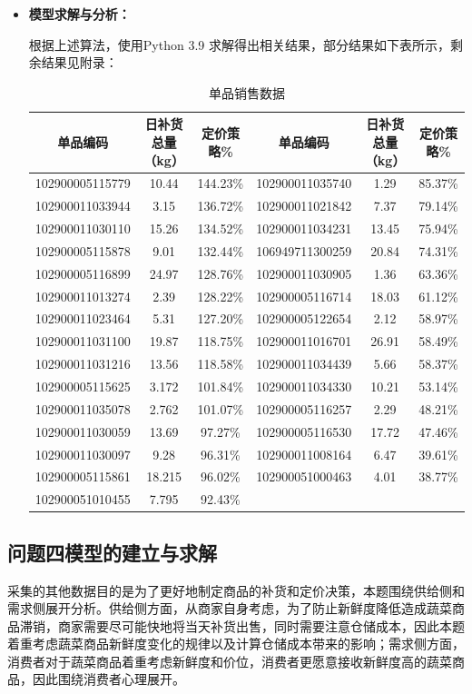 \documentclass{my_paper}
\begin{document}
\begin{itemize}
    \item \textbf{模型求解与分析：}\par
    \hspace{2em}根据上述算法，使用Python 3.9 求解得出相关结果，部分结果如下表所示，剩余结果见附录：
    \begin{table}[H]
    \caption{单品销售数据}
    \centering
    \begin{tabular}{cccccc}
    \toprule
        单品编码 & 日补货总量（kg） & 定价策略\% &单品编码 & 日补货总量（kg） & 定价策略\%\\ 
        \midrule
        102900005115779 & 10.44 & 144.23\% & 102900011035740 & 1.29 & 85.37\% \\ 
        102900011033944 & 3.15 & 136.72\% & 102900011021842 & 7.37 & 79.14\% \\ 
        102900011030110 & 15.26 & 134.52\% & 102900011034231 & 13.45 & 75.94\% \\ 
        102900005115878 & 9.01 & 132.44\% &106949711300259 & 20.84 & 74.31\% \\ 
        102900005116899 & 24.97 & 128.76\% &  102900011030905 & 1.36 & 63.36\% \\ 
        102900011013274 & 2.39& 128.22\% & 102900005116714 & 18.03 & 61.12\% \\ 
        102900011023464 & 5.31 & 127.20\%  & 102900005122654 & 2.12 & 58.97\% \\ 
        102900011031100 & 19.87 & 118.75\% &  102900011016701 & 26.91 & 58.49\% \\ 
        102900011031216 & 13.56 & 118.58\% & 102900011034439 & 5.66 & 58.37\% \\ 
        102900005115625 & 3.172 & 101.84\%  &102900011034330 & 10.21 & 53.14\% \\ 
        102900011035078 & 2.762 & 101.07\%  &102900005116257 & 2.29 & 48.21\% \\ 
        102900011030059 & 13.69 & 97.27\%  &  102900005116530 & 17.72 & 47.46\% \\ 
        102900011030097 & 9.28 & 96.31\% &102900011008164 & 6.47 & 39.61\% \\ 
        102900005115861 & 18.215 & 96.02\% &   102900051000463 & 4.01 & 38.77\% \\ 
        102900051010455 & 7.795 & 92.43\%  &~   &~&~\\
        \bottomrule
    \end{tabular}
\end{table}
\end{itemize}
\subsection{问题四模型的建立与求解}
采集的其他数据目的是为了更好地制定商品的补货和定价决策，本题围绕供给侧和需求侧展开分析。供给侧方面，从商家自身考虑，为了防止新鲜度降低造成蔬菜商品滞销，商家需要尽可能快地将当天补货出售，同时需要注意仓储成本，因此本题着重考虑蔬菜商品新鲜度变化的规律以及计算仓储成本带来的影响；需求侧方面，消费者对于蔬菜商品着重考虑新鲜度和价位，消费者更愿意接收新鲜度高的蔬菜商品，因此围绕消费者心理展开。
\end{document}
